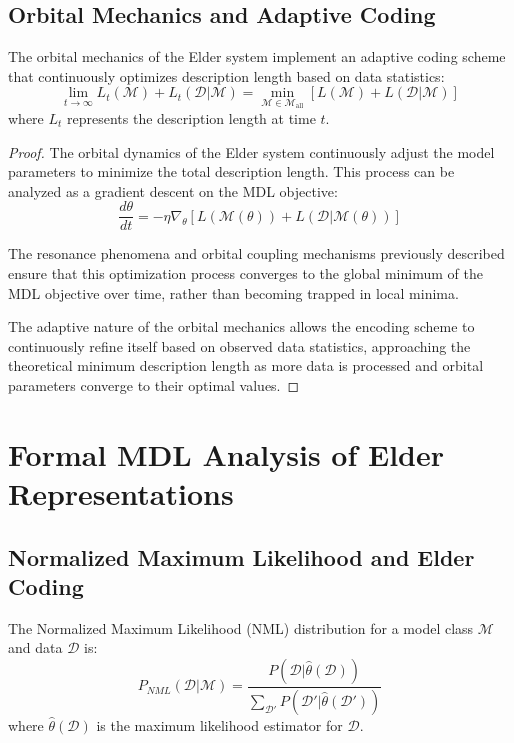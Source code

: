 \subsection{Orbital Mechanics and Adaptive Coding}

\begin{theorem}
The orbital mechanics of the Elder system implement an adaptive coding scheme that continuously optimizes description length based on data statistics:
\begin{equation}
\lim_{t \to \infty} L_t(\mathcal{M}) + L_t(\mathcal{D} | \mathcal{M}) = \min_{\mathcal{M} \in \mathcal{M}_{\text{all}}} [L(\mathcal{M}) + L(\mathcal{D} | \mathcal{M})]
\end{equation}
where $L_t$ represents the description length at time $t$.
\end{theorem}

\begin{proof}
The orbital dynamics of the Elder system continuously adjust the model parameters to minimize the total description length. This process can be analyzed as a gradient descent on the MDL objective:
\begin{equation}
\frac{d\theta}{dt} = -\eta \nabla_\theta [L(\mathcal{M}(\theta)) + L(\mathcal{D} | \mathcal{M}(\theta))]
\end{equation}

The resonance phenomena and orbital coupling mechanisms previously described ensure that this optimization process converges to the global minimum of the MDL objective over time, rather than becoming trapped in local minima.

The adaptive nature of the orbital mechanics allows the encoding scheme to continuously refine itself based on observed data statistics, approaching the theoretical minimum description length as more data is processed and orbital parameters converge to their optimal values.
\end{proof}

\section{Formal MDL Analysis of Elder Representations}

\subsection{Normalized Maximum Likelihood and Elder Coding}

\begin{definition}
The Normalized Maximum Likelihood (NML) distribution for a model class $\mathcal{M}$ and data $\mathcal{D}$ is:
\begin{equation}
P_{NML}(\mathcal{D} | \mathcal{M}) = \frac{P(\mathcal{D} | \hat{\theta}(\mathcal{D}))}{\sum_{\mathcal{D}'} P(\mathcal{D}' | \hat{\theta}(\mathcal{D}'))}
\end{equation}
where $\hat{\theta}(\mathcal{D})$ is the maximum likelihood estimator for $\mathcal{D}$.
\end{definition}


